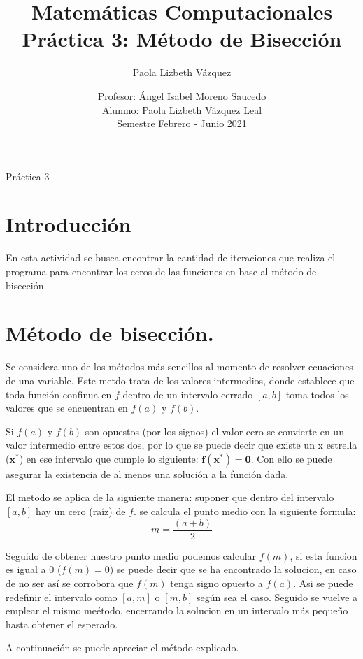 \documentclass[12pt,a4paper]{article}
\author{Paola Lizbeth Vázquez}
\title{Matemáticas Computacionales \\ Práctica 3: Método de Bisección }
\author{Profesor: Ángel Isabel Moreno Saucedo \\ Alumno: Paola Lizbeth Vázquez Leal \\ Semestre Febrero - Junio 2021}
\date{}
\begin{document}
\maketitle
Práctica 3
\section{Introducción}

En esta actividad se busca encontrar la cantidad de iteraciones que realiza el programa para encontrar los ceros de las funciones en base al método de bisección.

\section{Método de bisección.}

Se considera uno de los métodos más sencillos al momento de resolver ecuaciones de una variable. Este metdo trata de los valores intermedios, donde establece que toda función confinua en $f$ dentro de un intervalo cerrado $[a,b]$  toma todos los valores que se encuentran en $f(a)$ y $f(b)$. 

Si $f(a)$ y $f(b)$ son opuestos (por los signos) el valor cero se convierte en un valor intermedio entre estos dos, por lo que se puede decir que existe un x estrella ($\mathbf{x^*}$) en ese intervalo que cumple lo siguiente: $\mathbf{f(x^*)=0}$.
Con ello se puede asegurar la existencia de al menos una solución a la función dada.


El metodo se aplica de la siguiente manera: 
suponer que dentro del intervalo $[a,b]$ hay un cero (raíz) de $f$. se calcula el punto medio con la siguiente formula:
\begin{equation}
 m= \frac{(a+b)}{2}
\end{equation}

Seguido de obtener nuestro punto medio podemos calcular $f(m)$, si esta funcion es igual a 0 ($f(m)=0$) se puede decir que se ha encontrado la solucion, en caso de no ser así se corrobora que $f(m)$ tenga signo opuesto a $f(a)$. Asi se puede redefinir el intervalo como $[a,m]$ o $[m,b]$ según sea el caso. Seguido se vuelve a emplear el mismo meétodo, encerrando la solucion en un intervalo más pequeño hasta obtener el esperado. \citep{Metnum}

\citep{repositorio} A continuación se puede apreciar el método explicado. 
\end{document}
